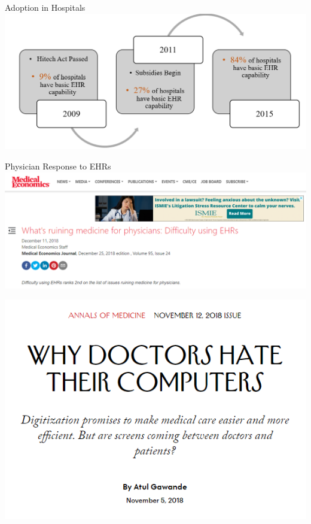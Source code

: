 \documentclass[10pt]{beamer}
\begin{document}
\begin{frame}{Adoption in Hospitals}
\centering
\includegraphics[scale=.4]{graphics/timeline.PNG}
\end{frame}



\begin{frame}{Physician Response to EHRs}
\centering
\includegraphics[scale=.3]{graphics/News Clip3.PNG}

                \vspace{4mm}
                
\includegraphics[scale=.3]{graphics/News Clip2.PNG}
\end{frame}
\end{document}
